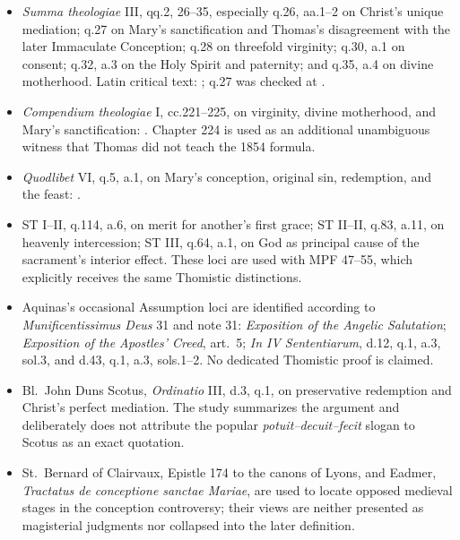 \begin{itemize}
  \item \emph{Summa theologiae} III, qq.2, 26--35, especially q.26, aa.1--2 on Christ's unique mediation; q.27 on Mary's sanctification and Thomas's disagreement with the later Immaculate Conception; q.28 on threefold virginity; q.30, a.1 on consent; q.32, a.3 on the Holy Spirit and paternity; and q.35, a.4 on divine motherhood. Latin critical text: ; q.27 was checked at .
  \item \emph{Compendium theologiae} I, cc.221--225, on virginity, divine motherhood, and Mary's sanctification: . Chapter 224 is used as an additional unambiguous witness that Thomas did not teach the 1854 formula.
  \item \emph{Quodlibet} VI, q.5, a.1, on Mary's conception, original sin, redemption, and the feast: .
  \item ST I--II, q.114, a.6, on merit for another's first grace; ST II--II, q.83, a.11, on heavenly intercession; ST III, q.64, a.1, on God as principal cause of the sacrament's interior effect. These loci are used with MPF 47--55, which explicitly receives the same Thomistic distinctions.
  \item Aquinas's occasional Assumption loci are identified according to \emph{Munificentissimus Deus} 31 and note 31: \emph{Exposition of the Angelic Salutation}; \emph{Exposition of the Apostles' Creed}, art.~5; \emph{In IV Sententiarum}, d.12, q.1, a.3, sol.3, and d.43, q.1, a.3, sols.1--2. No dedicated Thomistic proof is claimed.
  \item Bl.~John Duns Scotus, \emph{Ordinatio} III, d.3, q.1, on preservative redemption and Christ's perfect mediation. The study summarizes the argument and deliberately does not attribute the popular \emph{potuit--decuit--fecit} slogan to Scotus as an exact quotation.
  \item St.~Bernard of Clairvaux, Epistle 174 to the canons of Lyons, and Eadmer, \emph{Tractatus de conceptione sanctae Mariae}, are used to locate opposed medieval stages in the conception controversy; their views are neither presented as magisterial judgments nor collapsed into the later definition.
\end{itemize}

\endgroup
